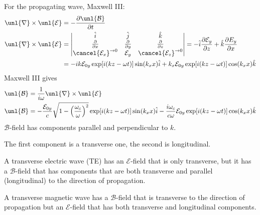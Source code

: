 \documentclass[a4paper, 11pt, normalem]{report}
\newcommand\p{\partial}
\newcommand\E{\mathcal{E}}
\newcommand\uE{\unl{\E}}
\newcommand\B{\mathcal{B}}
\newcommand\uB{\unl{\B}}
\newcommand\del{\unl{\nabla}}
\newcommand\om{\omega}
\begin{document}
For the propagating wave, Maxwell \RN{3}:
\begin{align}
	\del \times \uE &= -\frac{\p\uB}{\p t} \\
	\del \times \uE &=
	\begin{vmatrix}
		\hat{i} & \hat{j} & \hat{k} \\
		\frac{\p}{\p x} & \frac{\p}{\p y} & \frac{\p}{\p z} \\
		\cancel{\E_x}^{\to 0} & \E_y & \cancel{\E_z}^{\to 0}
	\end{vmatrix}
	= -\hat{i}\frac{\p\E_y}{\p z} + \hat{k} \frac{\p E_y}{\p x} \\
	&= -ik\E_{0y}\exp[i(kz - \om t)]\sin(k_xx)\hat{i} + k_x\E_{0y}\exp[i(kz - \om t)]\cos(k_xx)\hat{k}
\end{align}
Maxwell \RN{3} gives
\begin{align}
	\uB &= \frac{1}{i\om}\del\times\uE \\
	\uB &= -\frac{\E_{0y}}{c}\sqrt{1 - \left(\frac{\om_c}{\om}\right)^2}\exp[i(kz - \om t)]\sin(k_xx)\hat{i} - \frac{i\om_c}{c\om}\E_{0y}\exp[i(kz - \om t)]\cos(k_xx)\hat{k}
\end{align}
$\B$-field has components parallel and perpendicular to $k$.

The first component is a transverse one, the second is longitudinal.

A transverse electric wave (TE) has an $\E$-field that is only transverse, but it has a $\B$-field that has components that are both transverse and parallel (longitudinal) to the direction of propagation.

A transverse magnetic wave has a $\B$-field that is transverse to the direction of propagation but an $\E$-field that has both transverse and longitudinal components.
\end{document}
